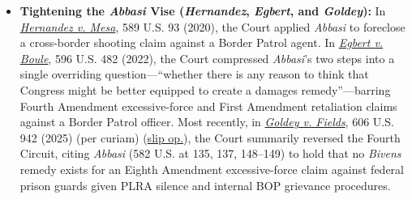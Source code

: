 \documentclass[12pt]{article}
\begin{document}
\begin{itemize}
  \item \textbf{Tightening the \textit{Abbasi} Vise (\textit{Hernandez}, \textit{Egbert}, and \textit{Goldey}):} In \href{https://supreme.justia.com/cases/federal/us/589/17-1678/}{\textit{Hernandez v. Mesa}}, 589 U.S. 93 (2020), the Court applied \textit{Abbasi} to foreclose a cross-border shooting claim against a Border Patrol agent. In \href{https://supreme.justia.com/cases/federal/us/596/21-147/}{\textit{Egbert v. Boule}}, 596 U.S. 482 (2022), the Court compressed \textit{Abbasi}'s two steps into a single overriding question---``whether there is any reason to think that Congress might be better equipped to create a damages remedy''---barring Fourth Amendment excessive-force and First Amendment retaliation claims against a Border Patrol officer. Most recently, in \href{https://supreme.justia.com/cases/federal/us/606/24-809/}{\textit{Goldey v. Fields}}, 606 U.S. 942 (2025) (per curiam) (\href{https://www.supremecourt.gov/opinions/24pdf/24-809_9o6b.pdf}{slip op.}), the Court summarily reversed the Fourth Circuit, citing \textit{Abbasi} (582 U.S. at 135, 137, 148--149) to hold that no \textit{Bivens} remedy exists for an Eighth Amendment excessive-force claim against federal prison guards given PLRA silence and internal BOP grievance procedures.

\end{itemize}
\end{document}

